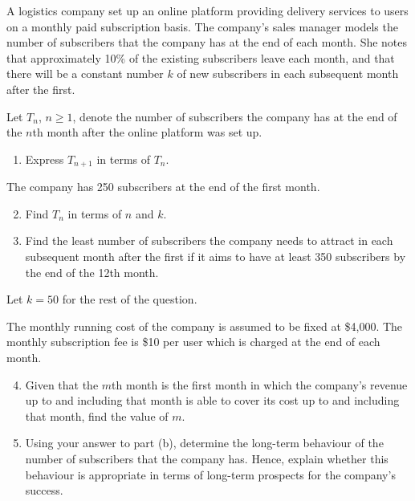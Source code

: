 \documentclass{echw}
\begin{document}

    \problem{}
        A logistics company set up an online platform providing delivery services to users on a monthly paid subscription basis. The company's sales manager models the number of subscribers that the company has at the end of each month. She notes that approximately 10\% of the existing subscribers leave each month, and that there will be a constant number $k$ of new subscribers in each subsequent month after the first.

        Let $T_n$, $n \geq 1$, denote the number of subscribers the company has at the end of the $n$th month after the online platform was set up.

        \begin{enumerate}
            \item Express $T_{n+1}$ in terms of $T_n$.
        \end{enumerate}

        The company has 250 subscribers at the end of the first month.

        \begin{enumerate}
            \setcounter{enumi}{1}
            \item Find $T_n$ in terms of $n$ and $k$.
            \item Find the least number of subscribers the company needs to attract in each subsequent month after the first if it aims to have at least 350 subscribers by the end of the 12th month.
        \end{enumerate}

        Let $k = 50$ for the rest of the question.

        The monthly running cost of the company is assumed to be fixed at \$4,000. The monthly subscription fee is \$10 per user which is charged at the end of each month.

        \begin{enumerate}
            \setcounter{enumi}{3}
            \item Given that the $m$th month is the first month in which the company's revenue up to and including that month is able to cover its cost up to and including that month, find the value of $m$.
            \item Using your answer to part (b), determine the long-term behaviour of the number of subscribers that the company has. Hence, explain whether this behaviour is appropriate in terms of long-term prospects for the company's success.    
        \end{enumerate}
\end{document}
